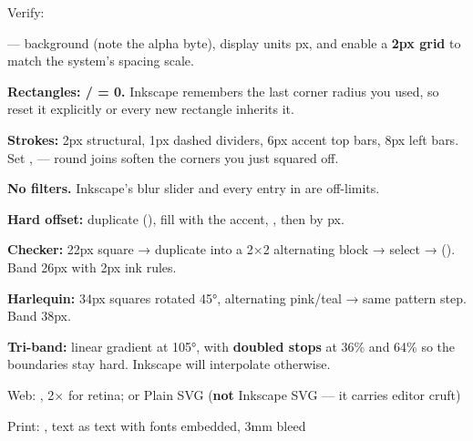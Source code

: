 \documentclass[fontpath=fonts/,logopath=logo/]{riposte-doc}
\begin{document}
Verify: 





 — background  (note the alpha byte), display units px, and enable a \textbf{2px grid} to match the system's spacing scale.



\begin{ripbullets}
\item \textbf{Rectangles: / = 0.} Inkscape remembers the last corner radius you used, so reset it explicitly or every new rectangle inherits it.
\item \textbf{Strokes:} 2px structural, 1px dashed dividers, 6px accent top bars, 8px left bars. Set ,  — round joins soften the corners you just squared off.
\item \textbf{No filters.} Inkscape's blur slider and every entry in  are off-limits.
\item \textbf{Hard offset:} duplicate (), fill with the accent, , then  by  px.
\end{ripbullets}



\begin{ripbullets}
\item \textbf{Checker:} 22px square → duplicate into a 2×2 alternating block → select →  (). Band 26px with 2px ink rules.
\item \textbf{Harlequin:} 34px squares rotated 45°, alternating pink/teal → same pattern step. Band 38px.
\item \textbf{Tri-band:} linear gradient at 105°, with \textbf{doubled stops} at 36\% and 64\% so the boundaries stay hard. Inkscape will interpolate otherwise.
\end{ripbullets}



\begin{ripbullets}
\item Web: , 2× for retina; or Plain SVG (\textbf{not} Inkscape SVG — it carries editor cruft)
\item Print: , text as text with fonts embedded, 3mm bleed
\end{ripbullets}
\end{document}
